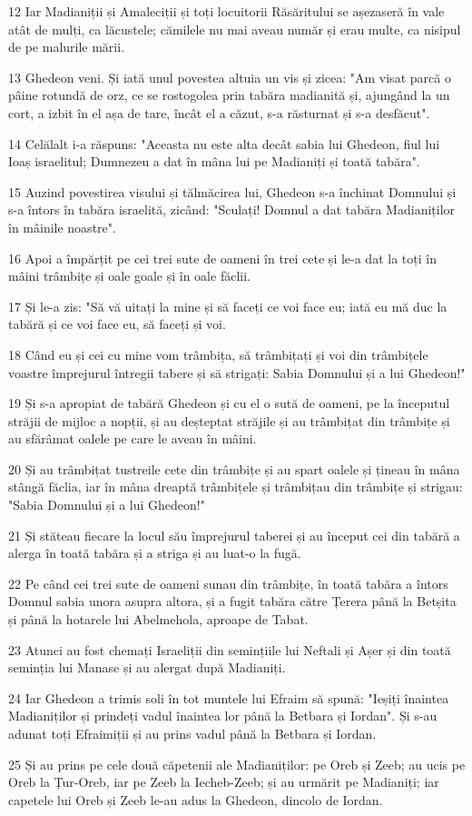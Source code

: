 \par 12 Iar Madianiții și Amaleciții și toți locuitorii Răsăritului se așezaseră în vale atât de mulți, ca lăcustele; cămilele nu mai aveau număr și erau multe, ca nisipul de pe malurile mării.
\par 13 Ghedeon veni. Și iată unul povestea altuia un vis și zicea: "Am visat parcă o pâine rotundă de orz, ce se rostogolea prin tabăra madianită și, ajungând la un cort, a izbit în el așa de tare, încât el a căzut, s-a răsturnat și s-a desfăcut".
\par 14 Celălalt i-a răspuns: "Aceasta nu este alta decât sabia lui Ghedeon, fiul lui Ioaș israelitul; Dumnezeu a dat în mâna lui pe Madianiți și toată tabăra".
\par 15 Auzind povestirea visului și tălmăcirea lui, Ghedeon s-a închinat Domnului și s-a întors în tabăra israelită, zicând: "Sculați! Domnul a dat tabăra Madianiților în mâinile noastre".
\par 16 Apoi a împărțit pe cei trei sute de oameni în trei cete și le-a dat la toți în mâini trâmbițe și oale goale și în oale făclii.
\par 17 Și le-a zis: "Să vă uitați la mine și să faceți ce voi face eu; iată eu mă duc la tabără și ce voi face eu, să faceți și voi.
\par 18 Când eu și cei cu mine vom trâmbița, să trâmbițați și voi din trâmbițele voastre împrejurul întregii tabere și să strigați: Sabia Domnului și a lui Ghedeon!"
\par 19 Și s-a apropiat de tabără Ghedeon și cu el o sută de oameni, pe la începutul străjii de mijloc a nopții, și au deșteptat străjile și au trâmbițat din trâmbițe și au sfărâmat oalele pe care le aveau în mâini.
\par 20 Și au trâmbițat tustreile cete din trâmbițe și au spart oalele și țineau în mâna stângă făclia, iar în mâna dreaptă trâmbițele și trâmbițau din trâmbițe și strigau: "Sabia Domnului și a lui Ghedeon!"
\par 21 Și stăteau fiecare la locul său împrejurul taberei și au început cei din tabără a alerga în toată tabăra și a striga și au luat-o la fugă.
\par 22 Pe când cei trei sute de oameni sunau din trâmbițe, în toată tabăra a întors Domnul sabia unora asupra altora, și a fugit tabăra către Țerera până la Betșita și până la hotarele lui Abelmehola, aproape de Tabat.
\par 23 Atunci au fost chemați Israeliții din semințiile lui Neftali și Așer și din toată seminția lui Manase și au alergat după Madianiți.
\par 24 Iar Ghedeon a trimis soli în tot muntele lui Efraim să spună: "Ieșiți înaintea Madianiților și prindeți vadul înaintea lor până la Betbara și Iordan". Și s-au adunat toți Efraimiții și au prins vadul până la Betbara și Iordan.
\par 25 Și au prins pe cele două căpetenii ale Madianiților: pe Oreb și Zeeb; au ucis pe Oreb la Țur-Oreb, iar pe Zeeb la Iecheb-Zeeb; și au urmărit pe Madianiți; iar capetele lui Oreb și Zeeb le-au adus la Ghedeon, dincolo de Iordan.

